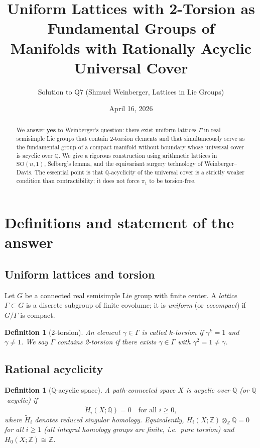 \documentclass[12pt]{article}
\title{Uniform Lattices with 2-Torsion as Fundamental Groups of\\
Manifolds with Rationally Acyclic Universal Cover}
\author{Solution to Q7 (Shmuel Weinberger, Lattices in Lie Groups)}
\date{April 16, 2026}
\newtheorem{definition}[theorem]{Definition}
\newcommand{\Z}{\mathbb{Z}}
\newcommand{\Q}{\mathbb{Q}}
\newcommand{\SO}{\mathrm{SO}}
\begin{document}
\maketitle

\begin{abstract}
We answer \textbf{yes} to Weinberger's question: there exist uniform lattices $\Gamma$ in real
semisimple Lie groups that contain 2-torsion elements and that simultaneously serve as the
fundamental group of a compact manifold without boundary whose universal cover is acyclic
over $\Q$.  We give a rigorous construction using arithmetic lattices in $\SO(n,1)$, Selberg's
lemma, and the equivariant surgery technology of Weinberger--Davis.  The essential point is
that $\Q$-acyclicity of the universal cover is a strictly weaker condition than contractibility;
it does not force $\pi_1$ to be torsion-free.
\end{abstract}

\tableofcontents

\section{Definitions and statement of the answer}

\subsection{Uniform lattices and torsion}

Let $G$ be a connected real semisimple Lie group with finite center.  A \emph{lattice}
$\Gamma \subset G$ is a discrete subgroup of finite covolume; it is \emph{uniform}
(or \emph{cocompact}) if $G/\Gamma$ is compact.

\begin{definition}[2-torsion]
An element $\gamma \in \Gamma$ is called \emph{$k$-torsion} if $\gamma^k = 1$ and
$\gamma \neq 1$.  We say $\Gamma$ \emph{contains 2-torsion} if there exists $\gamma \in \Gamma$
with $\gamma^2 = 1 \neq \gamma$.
\end{definition}

\subsection{Rational acyclicity}

\begin{definition}[$\Q$-acyclic space]
A path-connected space $X$ is \emph{acyclic over $\Q$} (or \emph{$\Q$-acyclic}) if
\[
  \widetilde{H}_i(X;\Q) = 0 \quad \text{for all } i \geq 0,
\]
where $\widetilde{H}_i$ denotes reduced singular homology.  Equivalently,
$H_i(X;\Z)\otimes_\Z \Q = 0$ for all $i\geq 1$ (all integral homology groups are finite,
i.e.\ pure torsion) and $H_0(X;\Z) \cong \Z$.
\end{definition}
\end{document}

